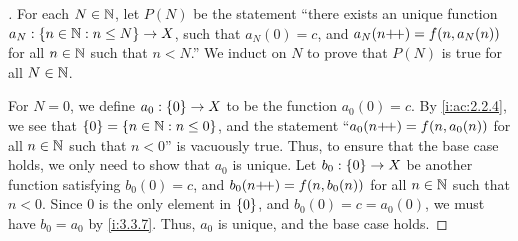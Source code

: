 \begin{proof}[]
  For each \(N \in \mathbb{N}\), let \(P(N)\) be the statement ``there exists an unique function \(a_N : \left\lbrace n \in \mathbb{N} : n \leq N\right\rbrace \to X\), such that \(a_N(0) = c\), and \(a_N(n{+}\!{+}) = f(n, a_N(n))\) for all \(n \in \mathbb{N}\) such that \(n < N\).''
  We induct on \(N\) to prove that \(P(N)\) is true for all \(N \in \mathbb{N}\).

  For \(N = 0\), we define \(a_0 : \left\lbrace0\right\rbrace \to X\) to be the function \(a_0(0) = c\).
  By \cref{i:ac:2.2.4}, we see that \(\left\lbrace0\right\rbrace = \left\lbrace n \in \mathbb{N} : n \leq 0\right\rbrace\), and the statement ``\(a_0(n{+}\!{+}) = f(n, a_0(n))\) for all \(n \in \mathbb{N}\) such that \(n < 0\)'' is vacuously true.
  Thus, to ensure that the base case holds, we only need to show that \(a_0\) is unique.
  Let \(b_0 : \left\lbrace0\right\rbrace \to X\) be another function satisfying \(b_0(0) = c\), and \(b_0(n{+}\!{+}) = f(n, b_0(n))\) for all \(n \in \mathbb{N}\) such that \(n < 0\).
  Since \(0\) is the only element in \(\left\lbrace0\right\rbrace\), and \(b_0(0) = c = a_0(0)\), we must have \(b_0 = a_0\) by \cref{i:3.3.7}.
  Thus, \(a_0\) is unique, and the base case holds.


\end{proof}
